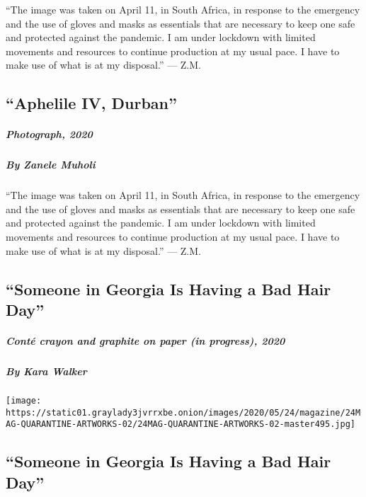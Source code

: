 ``The image was taken on April 11, in South Africa, in response to the
emergency and the use of gloves and masks as essentials that are
necessary to keep one safe and protected against the pandemic. I am
under lockdown with limited movements and resources to continue
production at my usual pace. I have to make use of what is at my
disposal.'' --- Z.M.

\hypertarget{aphelile-iv-durban}{%
\subsection{``Aphelile IV, Durban''}\label{aphelile-iv-durban}}

\hypertarget{photograph-2020}{%
\subparagraph{Photograph, 2020}\label{photograph-2020}}

\hypertarget{by-zanele-muholi}{%
\subparagraph{By Zanele Muholi}\label{by-zanele-muholi}}

``The image was taken on April 11, in South Africa, in response to the
emergency and the use of gloves and masks as essentials that are
necessary to keep one safe and protected against the pandemic. I am
under lockdown with limited movements and resources to continue
production at my usual pace. I have to make use of what is at my
disposal.'' --- Z.M.

\hypertarget{someone-in-georgia-is-having-a-bad-hair-day}{%
\subsection{``Someone in Georgia Is Having a Bad Hair
Day''}\label{someone-in-georgia-is-having-a-bad-hair-day}}

\hypertarget{contuxe9-crayon-and-graphite-on-paper-in-progress-2020}{%
\subparagraph{Conté crayon and graphite on paper (in progress),
2020}\label{contuxe9-crayon-and-graphite-on-paper-in-progress-2020}}

\hypertarget{by-kara-walker}{%
\subparagraph{By Kara Walker}\label{by-kara-walker}}

\texttt{[image: https://static01.graylady3jvrrxbe.onion/images/2020/05/24/magazine/24MAG-QUARANTINE-ARTWORKS-02/24MAG-QUARANTINE-ARTWORKS-02-master495.jpg]}

\hypertarget{someone-in-georgia-is-having-a-bad-hair-day-1}{%
\subsection{``Someone in Georgia Is Having a Bad Hair
Day''}\label{someone-in-georgia-is-having-a-bad-hair-day-1}}


